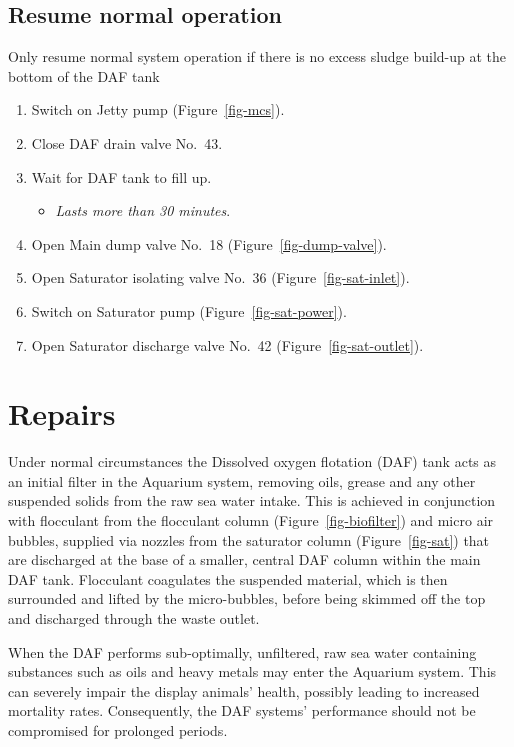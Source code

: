 \documentclass[
  12pt,
]{report}
\providecommand{\tightlist}{%
  \setlength{\itemsep}{0pt}\setlength{\parskip}{0pt}}\usepackage{longtable,booktabs,array}
\begin{document}
\hypertarget{resume-normal-operation}{%
\subsection{Resume normal operation}\label{resume-normal-operation}}

{Only resume normal system operation if there is no excess sludge
build-up at the bottom of the DAF tank}

\begin{enumerate}
\def\labelenumi{\arabic{enumi}.}
\setcounter{enumi}{34}
\tightlist
\item
  Switch on Jetty pump (Figure~\ref{fig-mcs}).
\item
  Close DAF drain valve No.~43.
\item
  Wait for DAF tank to fill up.

  \begin{itemize}
  \tightlist
  \item
    \emph{Lasts more than 30 minutes}.
  \end{itemize}
\item
  Open Main dump valve No.~18 (Figure~\ref{fig-dump-valve}).
\item
  Open Saturator isolating valve No.~36 (Figure~\ref{fig-sat-inlet}).
\item
  Switch on Saturator pump (Figure~\ref{fig-sat-power}).
\item
  Open Saturator discharge valve No.~42 (Figure~\ref{fig-sat-outlet}).
\end{enumerate}

\hypertarget{repairs}{%
\section{Repairs}\label{repairs}}

Under normal circumstances the Dissolved oxygen flotation (DAF) tank
acts as an initial filter in the Aquarium system, removing oils, grease
and any other suspended solids from the raw sea water intake. This is
achieved in conjunction with flocculant from the flocculant column
(Figure~\ref{fig-biofilter}) and micro air bubbles, supplied via nozzles
from the saturator column (Figure~\ref{fig-sat}) that are discharged at
the base of a smaller, central DAF column within the main DAF tank.
Flocculant coagulates the suspended material, which is then surrounded
and lifted by the micro-bubbles, before being skimmed off the top and
discharged through the waste outlet.

When the DAF performs sub-optimally, unfiltered, raw sea water
containing substances such as oils and heavy metals may enter the
Aquarium system. This can severely impair the display animals' health,
possibly leading to increased mortality rates. Consequently, the DAF
systems' performance should not be compromised for prolonged periods.
\end{document}
